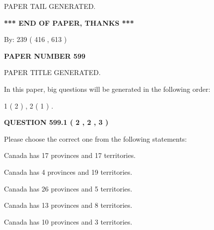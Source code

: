 \documentclass[12pt]{article}
\begin{document}
   
   
\vspace{2.0in} PAPER TAIL GENERATED.
   
   
   
   
\vspace{1.0in} 
{\textbf{\large{ *** END OF PAPER, THANKS *** }}} 
   
   
\hspace{1.0in} By: 
 239 ( 416 ,  613 )
   
   
   
   
\newpage 
\setcounter{page}{ 
   599001 } 
   
   
   
   
 {\textbf{ \Large{ PAPER NUMBER  599  }}}
   
   
\vspace{0.2in}
   
   
   
   
   
   
   
   
 \vspace{0.2in}
 
 
 
 
   
   
 PAPER TITLE GENERATED.
   
   
   
\vspace{0.2in}
   
In this paper, big questions will be generated in the following order: 
   
   
   1 ( 2 )
 ,
   2 ( 1 )
 .
  
\vspace{0.2in}
  
{\textbf{\Large{QUESTION
599.1 
 ( 2 , 2 , 3 )
}}}
  
  
Please choose the correct one from the following statements:
 
 
Canada has  17 provinces and  17 territories.
 
 
Canada has   4 provinces and  19 territories.
 
 
Canada has  26 provinces and  5 territories.
 
 
Canada has  13 provinces and  8 territories.
 
 
Canada has 10  provinces and 3 territories.
 
\end{document}
